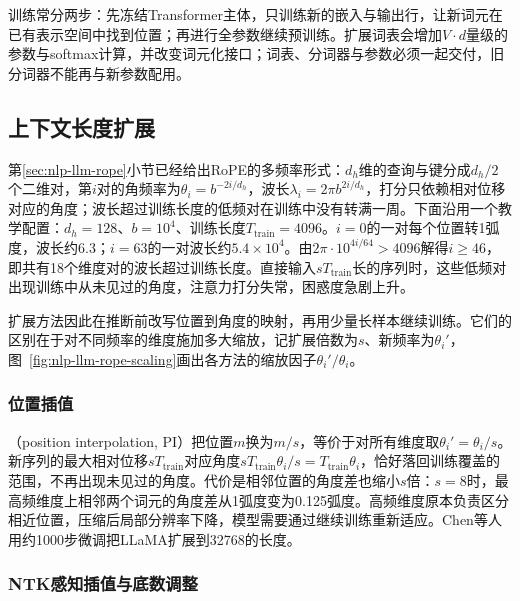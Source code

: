 训练常分两步：先冻结Transformer主体，只训练新的嵌入与输出行，让新词元在已有表示空间中找到位置；再进行全参数继续预训练。扩展词表会增加$V\cdot d$量级的参数与softmax计算，并改变词元化接口；词表、分词器与参数必须一起交付，旧分词器不能再与新参数配用。

\subsection{上下文长度扩展}
\label{sec:nlp-llm-context-extension}

第\ref{sec:nlp-llm-rope}小节已经给出RoPE的多频率形式：$d_h$维的查询与键分成$d_h/2$个二维对，第$i$对的角频率为$\theta_i=b^{-2i/d_h}$，波长$\lambda_i=2\pi b^{2i/d_h}$，打分只依赖相对位移对应的角度；波长超过训练长度的低频对在训练中没有转满一周。下面沿用一个教学配置：$d_h=128$、$b=10^4$、训练长度$T_{\mathrm{train}}=4096$。$i=0$的一对每个位置转1弧度，波长约6.3；$i=63$的一对波长约$5.4\times10^4$。由$2\pi\cdot10^{4i/64}>4096$解得$i\geq46$，即共有18个维度对的波长超过训练长度。直接输入$sT_{\mathrm{train}}$长的序列时，这些低频对出现训练中从未见过的角度，注意力打分失常，困惑度急剧上升。

扩展方法因此在推断前改写位置到角度的映射，再用少量长样本继续训练。它们的区别在于对不同频率的维度施加多大缩放，记扩展倍数为$s$、新频率为$\theta_i'$，图~\ref{fig:nlp-llm-rope-scaling}画出各方法的缩放因子$\theta_i'/\theta_i$。

\subsubsection{位置插值}
\label{sec:nlp-llm-position-interpolation}

（position interpolation, PI）把位置$m$换为$m/s$，等价于对所有维度取$\theta_i'=\theta_i/s$。新序列的最大相对位移$sT_{\mathrm{train}}$对应角度$sT_{\mathrm{train}}\theta_i/s=T_{\mathrm{train}}\theta_i$，恰好落回训练覆盖的范围，不再出现未见过的角度。代价是相邻位置的角度差也缩小$s$倍：$s=8$时，最高频维度上相邻两个词元的角度差从1弧度变为0.125弧度。高频维度原本负责区分相近位置，压缩后局部分辨率下降，模型需要通过继续训练重新适应。Chen等人用约1000步微调把LLaMA扩展到32768的长度。

\subsubsection{NTK感知插值与底数调整}
\label{sec:nlp-llm-ntk-interpolation}

